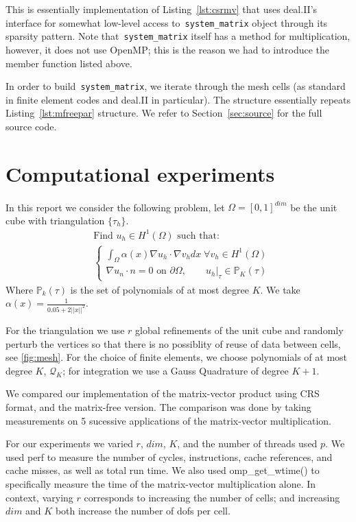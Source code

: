 \documentclass[12pt]{article}
\begin{document}
This is essentially implementation of Listing~\ref{lst:csrmv} that uses deal.II's interface for somewhat low-level access to~\texttt{system\_matrix} object through its sparsity pattern. Note that~\texttt{system\_matrix} itself has a method for multiplication, however, it does not use OpenMP; this is the reason we had to introduce the member function listed above.

In order to build~\texttt{system\_matrix}, we iterate through the mesh cells (as standard in finite element codes and deal.II in particular). The structure essentially repeats Listing~\ref{lst:mfreepar} structure. We refer to Section~\ref{sec:source} for the full source code. 

\section{Computational experiments}
In this report we consider the following problem, let $\Omega = [0, 1]^{dim}$ be the unit cube with triangulation $\{\tau_{h}\}$.
\begin{align*}
&\text{Find } u_{h} \in H^{1}(\Omega) \text{ such that: }  \\
&\begin{cases}
\int_{\Omega} \alpha(x) \nabla u_{h} \cdot \nabla v_{h} dx \; \forall v_{h} \in H^{1}(\Omega) \\
\nabla u_{n} \cdot n = 0 \text{ on } \partial \Omega ,\qquad u_{h} \vert_{\tau} \in \mathbb{P}_{K}(\tau) 
\end{cases}
\end{align*}
Where $\mathbb{P}_{k}(\tau) $ is the set of polynomials of at most degree $K$. We take $\alpha(x) = \frac{1}{0.05 + 2\vert \vert x \vert \vert^{2}}$.

For the triangulation we use $r$ global refinements of the unit cube and randomly perturb the vertices so that there is no possiblity of reuse of data between cells, see \ref{fig:mesh}. For the choice of finite elements, we choose polynomials of at most degree $K$, $\mathcal{Q}_{K}$; for integration we use a Gauss Quadrature of degree $K+1$. 

We compared our implementation of the matrix-vector product using CRS format, and the matrix-free version. The comparison was done by taking measurements on 5 sucessive applications of the matrix-vector multiplication.

For our experiments we varied $r$, $dim$, $K$, and the number of threads used $p$. We used perf to measure the number of cycles, instructions, cache references, and cache misses, as well as total run time. We also used omp\_get\_wtime() to specifically measure the time of the matrix-vector multiplication alone. In context, varying $r$ corresponds to increasing the number of cells; and increasing $dim$ and $K$ both increase the number of dofs per cell. 
\end{document}
